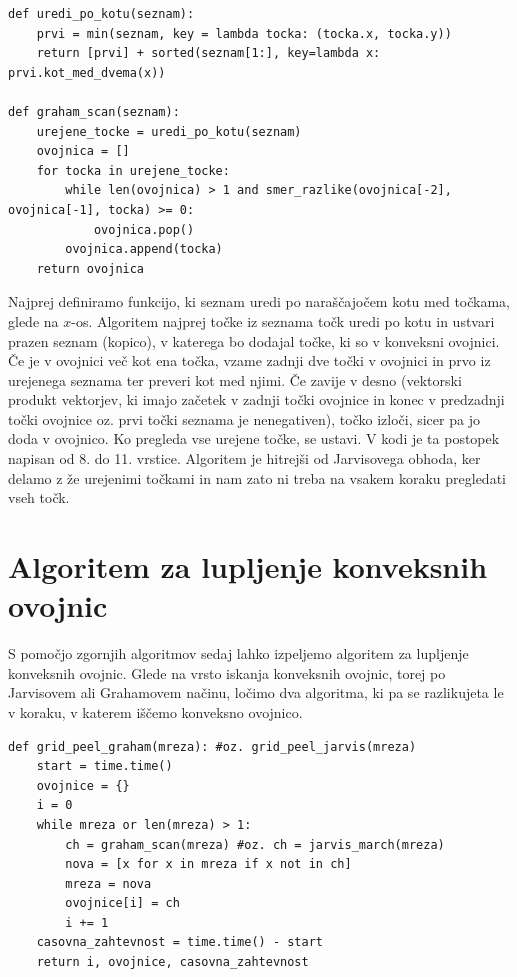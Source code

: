 \documentclass[a4paper]{article}
\begin{document}
\begin{lstlisting}
def uredi_po_kotu(seznam):
    prvi = min(seznam, key = lambda tocka: (tocka.x, tocka.y))
    return [prvi] + sorted(seznam[1:], key=lambda x: prvi.kot_med_dvema(x))

def graham_scan(seznam):
    urejene_tocke = uredi_po_kotu(seznam)
    ovojnica = []
    for tocka in urejene_tocke:
        while len(ovojnica) > 1 and smer_razlike(ovojnica[-2], ovojnica[-1], tocka) >= 0:           
            ovojnica.pop()
        ovojnica.append(tocka)
    return ovojnica
\end{lstlisting}

Najprej definiramo funkcijo, ki seznam uredi po naraščajočem kotu med točkama, glede na $x$-os. Algoritem najprej točke iz seznama točk uredi po kotu in ustvari prazen seznam (kopico), 
v katerega bo dodajal točke, ki so v konveksni ovojnici. Če je v ovojnici več kot ena točka, vzame zadnji dve točki v ovojnici in prvo iz urejenega seznama ter preveri kot med njimi.
Če zavije v desno (vektorski produkt vektorjev, ki imajo začetek v zadnji točki ovojnice in konec v predzadnji točki ovojnice oz. prvi točki seznama je nenegativen), točko izloči, 
sicer pa jo doda v ovojnico. Ko pregleda vse urejene točke, se ustavi. V kodi je ta postopek napisan od 8. do 11. vrstice. Algoritem je hitrejši od Jarvisovega obhoda, ker delamo z že urejenimi
točkami in nam zato ni treba na vsakem koraku pregledati vseh točk.

\section{Algoritem za lupljenje konveksnih ovojnic}
S pomočjo zgornjih algoritmov sedaj lahko izpeljemo algoritem za lupljenje konveksnih ovojnic. Glede na vrsto iskanja konveksnih ovojnic, torej po Jarvisovem ali 
Grahamovem načinu, ločimo dva algoritma, ki pa se razlikujeta le v koraku, v katerem iščemo konveksno ovojnico.

\begin{lstlisting}
def grid_peel_graham(mreza): #oz. grid_peel_jarvis(mreza)
    start = time.time()
    ovojnice = {}
    i = 0
    while mreza or len(mreza) > 1:
        ch = graham_scan(mreza) #oz. ch = jarvis_march(mreza)
        nova = [x for x in mreza if x not in ch]
        mreza = nova
        ovojnice[i] = ch
        i += 1
    casovna_zahtevnost = time.time() - start 
    return i, ovojnice, casovna_zahtevnost
\end{lstlisting}
\end{document}
